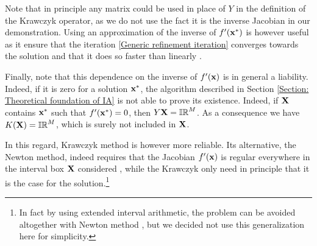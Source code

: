 \documentclass[
11pt, %
american, %
singlespacing, %
final, %
nolistspacing, %
liststotoc, %
headsepline, %
]{MastersDoctoralThesis} %
\begin{document}
Note that in principle any matrix could be used in place of $Y$ in the definition of the Krawczyk operator, as we do not use the fact it is the inverse Jacobian in our demonstration. Using an approximation of the inverse of $f'(\boldsymbol{\mathrm{x}}^*)$ is however useful as it ensure that the iteration \eqref{Generic refinement iteration} converges towards the solution and that it does so faster than linearly \cite{krawczyk1969newton}.

Finally, note that this dependence on the inverse of $f'(\boldsymbol{\mathrm{x}})$ is in general a liability. Indeed, if it is zero for a solution $\boldsymbol{\mathrm{x}}^*$, the algorithm described in Section \ref{Section: Theoretical foundation of IA} is not able to prove its existence. Indeed, if $\boldsymbol{\mathrm{X}}$ contains $\boldsymbol{\mathrm{x}}^*$ such that $f'(\boldsymbol{\mathrm{x}}^*) = 0$, then $Y \boldsymbol{\mathrm{X}} = \mathbb{IR}^M$. As a consequence we have $K(\boldsymbol{\mathrm{X}}) = \mathbb{IR}^M$, which is surely not included in $\boldsymbol{\mathrm{X}}$.

In this regard, Krawczyk method is however more reliable. Its alternative, the Newton method, indeed requires that the Jacobian $f'(\boldsymbol{\mathrm{x}})$ is regular everywhere in the interval box $\boldsymbol{\mathrm{X}}$ considered \cite{moore2009introduction, tucker2011validated}, while the Krawczyk only need in principle that it is the case for the solution.\footnote{In fact by using extended interval arithmetic, the problem can be avoided altogether with Newton method \cite{hansen1978globally}, but we decided not use this generalization here for simplicity.}



\printbibliography[heading=bibintoc]{}

\end{document}
